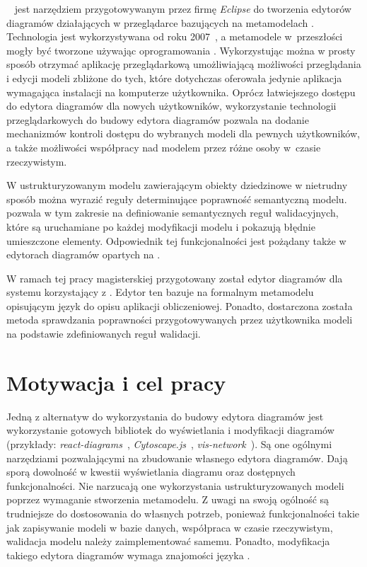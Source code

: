 \SiriusWeb{}~\cite{sirius-web-github} jest narzędziem przygotowywanym przez
firmę \emph{Eclipse} do tworzenia edytorów
diagramów działających w przeglądarce bazujących na metamodelach \EMF{}.
Technologia \EMF{} jest wykorzystywana od roku
2007~\cite{eclipse-sirius-wikipedia}, a metamodele
w~przeszłości mogły być tworzone używając oprogramowania \SiriusDesktop{}.
Wykorzystując \SiriusWeb{} można w prosty sposób otrzymać aplikację
przeglądarkową umożliwiającą możliwości przeglądania i edycji modeli zbliżone
do tych,
które dotychczas oferowała jedynie aplikacja wymagająca instalacji na
komputerze użytkownika. Oprócz łatwiejszego dostępu do edytora diagramów dla
nowych użytkowników, wykorzystanie technologii przeglądarkowych do budowy
edytora diagramów pozwala na dodanie mechanizmów kontroli dostępu do
wybranych modeli dla pewnych użytkowników, a także możliwości współpracy nad
modelem przez różne osoby w~czasie rzeczywistym.

W ustrukturyzowanym modelu zawierającym obiekty dziedzinowe w nietrudny sposób
można wyrazić reguły determinujące poprawność semantyczną modelu.
\SiriusDesktop{} pozwala w tym zakresie na definiowanie semantycznych reguł
walidacyjnych, które są uruchamiane po każdej modyfikacji modelu i pokazują
błędnie umieszczone elementy. Odpowiednik tej funkcjonalności jest pożądany
także w edytorach diagramów opartych na \SiriusWeb{}.

W ramach tej pracy magisterskiej przygotowany został edytor diagramów dla
systemu \BalticLSC{} korzystający z \SiriusWeb{}. Edytor ten bazuje na
formalnym metamodelu \EMF{} opisującym język \CAL{} do
opisu aplikacji obliczeniowej. Ponadto, dostarczona została metoda sprawdzania
poprawności przygotowywanych przez użytkownika modeli na podstawie
zdefiniowanych reguł walidacji.

\section{Motywacja i cel pracy}

Jedną z alternatyw do wykorzystania \SiriusWeb{} do budowy edytora diagramów
jest
wykorzystanie gotowych bibliotek \JavaScript{} do wyświetlania i modyfikacji
diagramów (przykłady: \emph{react-diagrams}~\cite{react-diagrams-github},
\emph{Cytoscape.js}~\cite{cytoscape-js-homepage},
\emph{vis-network}~\cite{vis-network-github}). Są one ogólnymi narzędziami
pozwalającymi na zbudowanie własnego edytora diagramów. Dają sporą dowolność w
kwestii wyświetlania diagramu oraz
dostępnych funkcjonalności. Nie narzucają one
wykorzystania ustrukturyzowanych modeli poprzez wymaganie stworzenia
metamodelu. Z uwagi na swoją ogólność są trudniejsze do dostosowania do
własnych potrzeb, ponieważ funkcjonalności takie jak zapisywanie modeli w bazie
danych, współpraca w czasie rzeczywistym, walidacja modelu należy
zaimplementować samemu. Ponadto, modyfikacja takiego edytora diagramów wymaga
znajomości języka \JavaScript{}.

